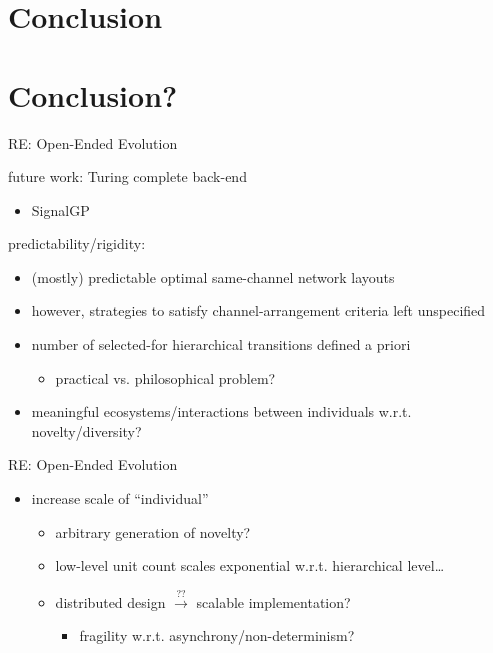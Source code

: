 \section{Conclusion}

\section{Conclusion?}

\begin{frame}{RE: Open-Ended Evolution}

future work: Turing complete back-end
\begin{itemize}
\item SignalGP \cite{lalejini2018evolving}
\end{itemize}

\pause
\vspace{2ex}

predictability/rigidity:
\begin{itemize}[<+->]
\item (mostly) predictable optimal same-channel network layouts
\item however, strategies to satisfy channel-arrangement criteria left unspecified
\item number of selected-for hierarchical transitions defined a priori
\begin{itemize}[<+->]
\item practical vs. philosophical problem?
\end{itemize}
\item meaningful ecosystems/interactions between individuals w.r.t. novelty/diversity? \cite{soros2014identifying,dolson2018evolution}
\end{itemize}

\end{frame}

\begin{frame}{RE: Open-Ended Evolution}

\begin{itemize}[<+->]
\item increase scale of ``individual''
  \begin{itemize}
  \item arbitrary generation of novelty? \cite{banzhaf2015open}
  \item low-level unit count scales exponential w.r.t. hierarchical level\dots
  \item distributed design $\stackrel{??}{\rightarrow}$ scalable implementation?
  \begin{itemize}
    \item fragility w.r.t. asynchrony/non-determinism? \cite{ackley2016indefinite}
  \end{itemize}
  \end{itemize}
\end{itemize}

\end{frame}

